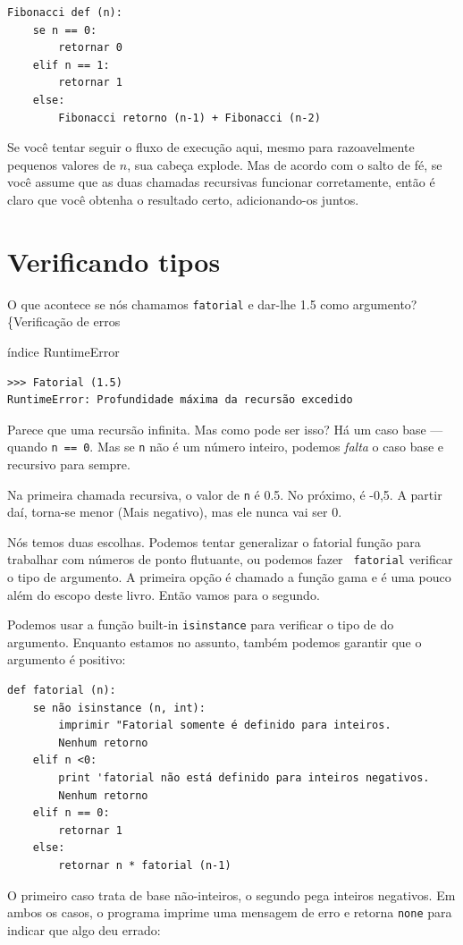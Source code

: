 \documentclass[10pt]{book}
\begin{document}
{{{\begin{verbatim}
Fibonacci def (n):
    se n == 0:
        retornar 0
    elif n == 1:
        retornar 1
    else:
        Fibonacci retorno (n-1) + Fibonacci (n-2)
\end{verbatim}
%
Se você tentar seguir o fluxo de execução aqui, mesmo para razoavelmente
pequenos valores de $ n $, sua cabeça explode. Mas de acordo com o
salto de fé, se você assume que as duas chamadas recursivas
funcionar corretamente, então é claro que você obtenha
o resultado certo, adicionando-os juntos.


\section{Verificando tipos}
\label{guardião}

O que acontece se nós chamamos {\tt fatorial} e dar-lhe 1.5 como argumento?
\{Verificação de erros} índice
\index{} RuntimeError

\begin{verbatim}
>>> Fatorial (1.5)
RuntimeError: Profundidade máxima da recursão excedido
\end{verbatim}
%
Parece que uma recursão infinita. Mas como pode ser isso? Há um
caso base --- quando {\tt n == 0}. Mas se {\tt n} não é um número inteiro,
podemos {\em falta} o caso base e recursivo para sempre.

Na primeira chamada recursiva, o valor de {\tt n} é 0.5.
No próximo, é -0,5. A partir daí, torna-se menor
(Mais negativo), mas ele nunca vai ser 0.

Nós temos duas escolhas. Podemos tentar generalizar o fatorial {\tt}
função para trabalhar com números de ponto flutuante, ou podemos fazer {\tt
  fatorial} verificar o tipo de argumento. A primeira opção é
chamado a função gama e é uma
pouco além do escopo deste livro. Então vamos para o segundo.

Podemos usar a função built-in {\tt isinstance} para verificar o tipo de
do argumento. Enquanto estamos no assunto, também podemos garantir que o
argumento é positivo:

\begin{verbatim}
def fatorial (n):
    se não isinstance (n, int):
        imprimir "Fatorial somente é definido para inteiros.
        Nenhum retorno
    elif n <0:
        print 'fatorial não está definido para inteiros negativos.
        Nenhum retorno
    elif n == 0:
        retornar 1
    else:
        retornar n * fatorial (n-1)
\end{verbatim}
%
O primeiro caso trata de base não-inteiros, o
segundo pega inteiros negativos. Em ambos os casos, o programa imprime
uma mensagem de erro e retorna {\tt none} para indicar que algo
deu errado:

}}
\end{document}
